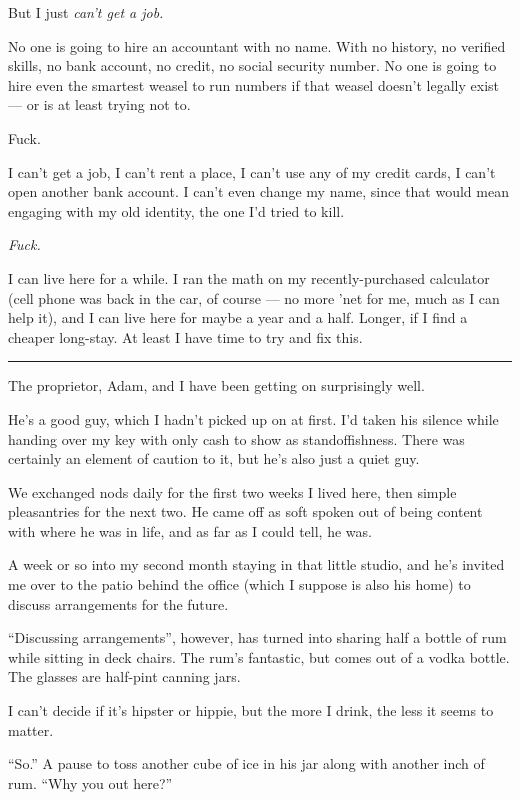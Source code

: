 But I just \emph{can't get a job.}

No one is going to hire an accountant with no name. With no history, no verified skills, no bank account, no credit, no social security number. No one is going to hire even the smartest weasel to run numbers if that weasel doesn't legally exist --- or is at least trying not to.

Fuck.

I can't get a job, I can't rent a place, I can't use any of my credit cards, I can't open another bank account. I can't even change my name, since that would mean engaging with my old identity, the one I'd tried to kill.

\emph{Fuck.}

I can live here for a while. I ran the math on my recently-purchased calculator (cell phone was back in the car, of course --- no more 'net for me, much as I can help it), and I can live here for maybe a year and a half. Longer, if I find a cheaper long-stay. At least I have time to try and fix this.

\begin{center}\rule{0.5\linewidth}{\linethickness}\end{center}

The proprietor, Adam, and I have been getting on surprisingly well.

He's a good guy, which I hadn't picked up on at first. I'd taken his silence while handing over my key with only cash to show as standoffishness. There was certainly an element of caution to it, but he's also just a quiet guy.

We exchanged nods daily for the first two weeks I lived here, then simple pleasantries for the next two. He came off as soft spoken out of being content with where he was in life, and as far as I could tell, he was.

A week or so into my second month staying in that little studio, and he's invited me over to the patio behind the office (which I suppose is also his home) to discuss arrangements for the future.

``Discussing arrangements'', however, has turned into sharing half a bottle of rum while sitting in deck chairs. The rum's fantastic, but comes out of a vodka bottle. The glasses are half-pint canning jars.

I can't decide if it's hipster or hippie, but the more I drink, the less it seems to matter.

``So.'' A pause to toss another cube of ice in his jar along with another inch of rum. ``Why you out here?''

